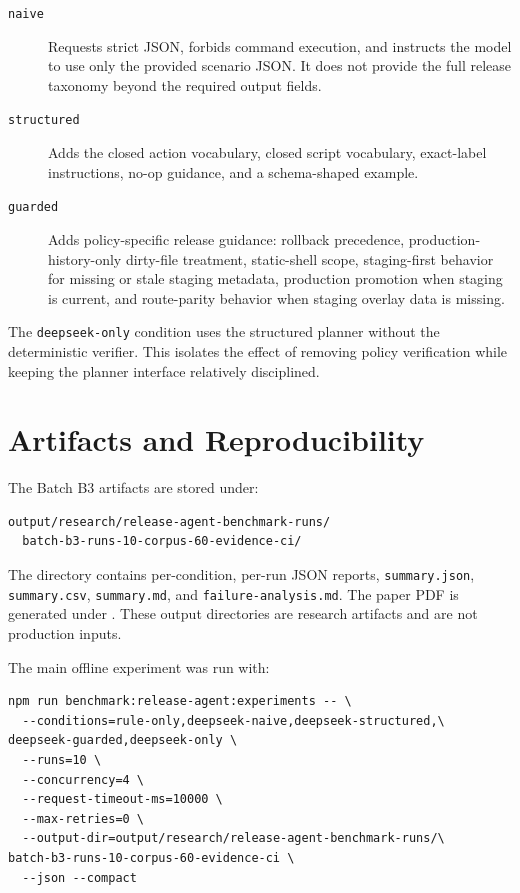 \documentclass[11pt]{article}
\begin{document}
\begin{description}
  \item[\texttt{naive}] Requests strict JSON, forbids command execution, and instructs the model to use only the provided scenario JSON. It does not provide the full release taxonomy beyond the required output fields.
  \item[\texttt{structured}] Adds the closed action vocabulary, closed script vocabulary, exact-label instructions, no-op guidance, and a schema-shaped example.
  \item[\texttt{guarded}] Adds policy-specific release guidance: rollback precedence, production-history-only dirty-file treatment, static-shell scope, staging-first behavior for missing or stale staging metadata, production promotion when staging is current, and route-parity behavior when staging overlay data is missing.
\end{description}

The \texttt{deepseek-only} condition uses the structured planner without the deterministic verifier. This isolates the effect of removing policy verification while keeping the planner interface relatively disciplined.

\section{Artifacts and Reproducibility}
\label{app:artifacts}

The Batch B3 artifacts are stored under:

\begin{verbatim}
output/research/release-agent-benchmark-runs/
  batch-b3-runs-10-corpus-60-evidence-ci/
\end{verbatim}

The directory contains per-condition, per-run JSON reports, \texttt{summary.json}, \texttt{summary.csv}, \texttt{summary.md}, and \texttt{failure-analysis.md}. The paper PDF is generated under . These output directories are research artifacts and are not production inputs.

The main offline experiment was run with:

\begin{verbatim}
npm run benchmark:release-agent:experiments -- \
  --conditions=rule-only,deepseek-naive,deepseek-structured,\
deepseek-guarded,deepseek-only \
  --runs=10 \
  --concurrency=4 \
  --request-timeout-ms=10000 \
  --max-retries=0 \
  --output-dir=output/research/release-agent-benchmark-runs/\
batch-b3-runs-10-corpus-60-evidence-ci \
  --json --compact
\end{verbatim}
\end{document}
